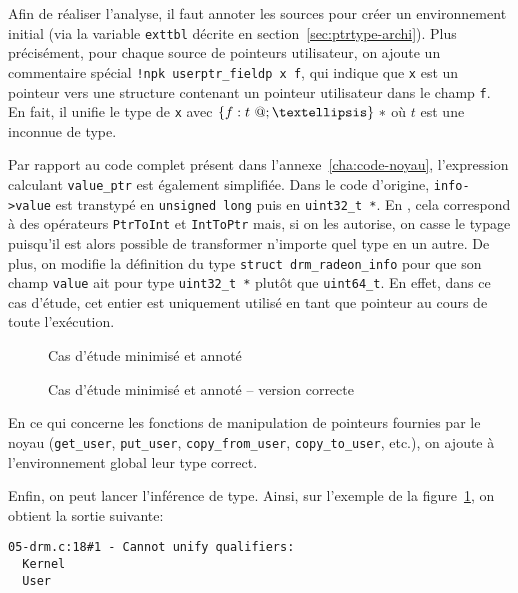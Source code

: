 Afin de réaliser l'analyse, il faut annoter les sources pour créer un
environnement initial (via la variable \texttt{exttbl} décrite en
section~\ref{sec:ptrtype-archi}). Plus précisément, pour chaque source de
pointeurs utilisateur, on ajoute un commentaire spécial \texttt{!npk
userptr\_fieldp x f}, qui indique que \texttt{x} est un pointeur vers une
structure contenant un pointeur utilisateur dans le champ \texttt{f}. En fait,
il unifie le type de \texttt{x} avec $\{ f: \ptrU{t} ; … \}~*$ où $t$ est une
inconnue de type.

Par rapport au code complet présent dans l'annexe~\ref{cha:code-noyau},
l'expression calculant \texttt{value_ptr} est également simplifiée. Dans le code
d'origine, \texttt{info->value} est transtypé en \texttt{unsigned long} puis en
\texttt{uint32\_t *}. En \newspeak, cela correspond à des opérateurs
\texttt{PtrToInt} \linebreak et \texttt{IntToPtr} mais, si on les autorise, on
casse le typage puisqu'il est alors possible de transformer n'importe quel type
en un autre. De plus, on modifie la définition du type \texttt{struct
drm\_radeon\_info} pour que son champ \texttt{value} ait pour type
\texttt{uint32\_t *} plutôt que \texttt{uint64\_t}. En effet, dans ce cas
d'étude, cet entier est uniquement utilisé en tant que pointeur au cours de
toute l'exécution.

\begin{figure}[p]

\caption{Cas d'étude minimisé et annoté}
\label{fig:ex-drm}
\end{figure}

\begin{figure}[p]


    \caption{Cas d'étude minimisé et annoté -- version correcte}
    \label{fig:ex-drm-ok}

\end{figure}

En ce qui concerne les fonctions de manipulation de pointeurs fournies
par le noyau (\texttt{get\_user}, \texttt{put\_user},
\texttt{copy\_from\_user}, \texttt{copy\_to\_user}, etc.), on ajoute à
l'environnement global leur type correct.

Enfin, on peut lancer l'inférence de type. Ainsi, sur l'exemple de la
figure~\ref{fig:ex-drm}, on obtient la sortie suivante:

\begin{Verbatim}
05-drm.c:18#1 - Cannot unify qualifiers:
  Kernel
  User
\end{Verbatim}

